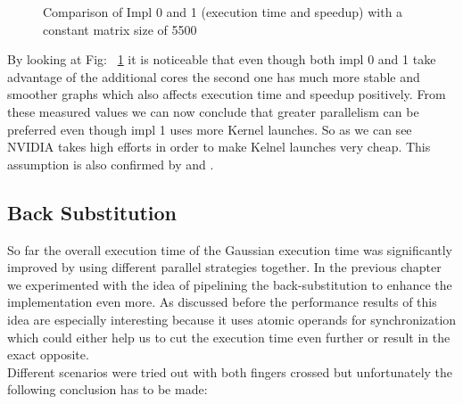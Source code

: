 \documentclass[draft, final]{vutinfth} %
\begin{document}
			\begin{figure}[!ht]
				\centering
				\begin{subfigure}[t]{2\textwidth}
				\end{subfigure}
				\caption{Comparison of Impl 0 and 1 (execution time and speedup) with a constant matrix size of 5500}
				\label{fig:impl_0and1_static_5500}
			\end{figure}

			By looking at Fig: ~\ref{fig:impl_0and1_static_5500} it is noticeable that even though both impl 0 and 1 take advantage of the additional cores the second one has much more stable and smoother graphs which also affects execution time and speedup positively. From these measured values we can now conclude that greater parallelism can be preferred even though impl 1 uses more Kernel launches. So as we can see NVIDIA takes high efforts in order to make Kelnel launches very cheap. This assumption is also confirmed by \cite{Sanders:2010:CEI:1891996} and \cite{Kirk:2010:PMP:1841511}.
		
		\subsection{Back Substitution}
			So far the overall execution time of the Gaussian execution time was significantly improved by using different parallel strategies together. In the previous chapter we experimented with the idea of pipelining the back-substitution to enhance the implementation even more. As discussed before the performance results of this idea are especially interesting because it uses atomic operands for synchronization which could either help us to cut the execution time even further or result in the exact opposite.\\
			Different scenarios were tried out with both fingers crossed but unfortunately the following conclusion has to be made:
\end{document}
